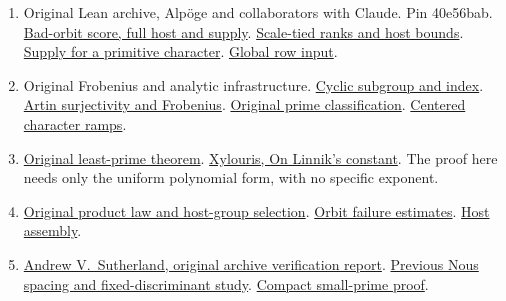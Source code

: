 \documentclass[12pt,letterpaper]{article}
\DeclareRobustCommand{\id}[1]{\mbox{\small\ttfamily #1}}
\newcommand{\old}[3]{\href{https://github.com/nousentllc/riemann-hypothesis/blob/40e56bab026552e089d7afcfeff08d2defb9c005/src/#1\#L#2}{#3}}
\begin{document}
\begin{enumerate}[leftmargin=*]
\item Original Lean archive, Alp\"oge and collaborators with Claude. Pin \id{40e56bab}. \old{Development/AbelianVarietyTheory/Definitions/GlobalTwisting/ThinScalesIffHostBound.lean}{36}{Bad-orbit score, full host and supply}. \old{Development/AbelianVarietyTheory/Definitions/GlobalTwisting/PairRowIffQdRows.lean}{28}{Scale-tied ranks and host bounds}. \old{Development/AutomorphicArithmetic/CharacterBoxes/SupplyChi.lean}{8}{Supply for a primitive character}. \old{Development/AutomorphicArithmetic/CharacterBoxes/MainConclusion.lean}{7}{Global row input}.
\item Original Frobenius and analytic infrastructure. \old{Formalism/SharpRestriction/RamificationFrobenius/TotientGaloisClasses/FrameFacts.lean}{204}{Cyclic subgroup and index}. \old{Formalism/SharpRestriction/RamificationFrobenius/TotientGaloisClasses/ConjEMemHostFIff.lean}{87}{Artin surjectivity and Frobenius}. \old{Formalism/LocalRingCardinality/RankBoundMonotoneInDimension.lean}{568}{Original prime classification}. \old{Formalism/SharpRestriction/RamificationFrobenius/TotientGaloisClasses/Analytic.lean}{23}{Centered character ramps}.
\item \old{Development/AutomorphicArithmetic/ThetaCorrespondence/Linnik.lean}{142}{Original least-prime theorem}. \href{https://arxiv.org/abs/0906.2749}{Xylouris, On Linnik's constant}. The proof here needs only the uniform polynomial form, with no specific exponent.
\item \old{Development/AutomorphicArithmetic/ThickFrames/topsGroup.lean}{58}{Original product law and host-group selection}. \old{Development/AutomorphicArithmetic/ThickFrames/orbitTerms.lean}{97}{Orbit failure estimates}. \old{Development/AutomorphicArithmetic/ShortNorms/hostOfFieldOf.lean}{159}{Host assembly}.
\item \href{https://math.mit.edu/~drew/grh/}{Andrew V.\ Sutherland, original archive verification report}. \href{https://github.com/nousentllc/riemann-hypothesis/tree/d5cdf95bdb5634d812782c464e799f8f5d0546ee/research/uriel/experiments/frobenius-spacing}{Previous Nous spacing and fixed-discriminant study}. \href{https://github.com/lsernau/grh-lean/blob/72fead102f663d5c7a407964a13dc0cf9d977207/grh-compact/src/New/Curve/DepthPairs.lean#L60}{Compact small-prime proof}.
\end{enumerate}
\end{document}
